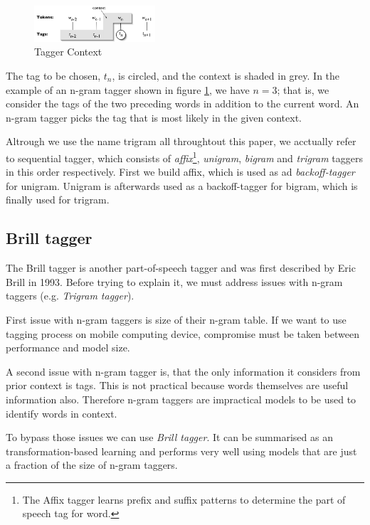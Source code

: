 \documentclass[10pt, conference, compsocconf]{IEEEtran}
\begin{document}
\begin{figure}[h]
\begin{center}
\includegraphics[width=0.4\textwidth]{tag-context.png} 
\end{center}
\caption{Tagger Context}
\label{fig:trigram}
\end{figure}

The tag to be chosen, $t_{n}$, is circled, and the context is shaded in grey.
In the example of an n-gram tagger shown in figure \ref{fig:trigram}, we have $n=3$; that is, we consider the tags of the two preceding words in addition to the current word.
An n-gram tagger picks the tag that is most likely in the given context.
\par
Altrough we use the name trigram all throughtout this paper, we acctually refer to sequential tagger, which consists of
\textit{affix}\footnote{The Affix tagger learns prefix and suffix patterns to determine the part of speech tag for word.}, \textit{unigram}, \textit{bigram} and \textit{trigram} taggers in this order respectively. First we build affix, which is used as ad \textit{backoff-tagger} for unigram. Unigram is afterwards used as a backoff-tagger for bigram, which is finally used for trigram.

\subsection{Brill tagger} %

The Brill tagger is another part-of-speech tagger and was first described by Eric Brill in 1993. Before trying to explain it, we must address issues with n-gram taggers (e.g. \textit{Trigram tagger}).

First issue with n-gram taggers is size of their n-gram table. If we want to use tagging process on mobile computing device, compromise must be taken between performance and model size. 

A second issue with n-gram tagger is, that the only information it considers from prior context is tags. This is not practical because words themselves are useful information also. Therefore n-gram taggers are impractical models to be used to identify words in context. 
  
To bypass those issues we can use \textit{Brill tagger}. It can be summarised as an transformation-based learning and performs very well using models that are just a fraction of the size of n-gram taggers.
\end{document}

